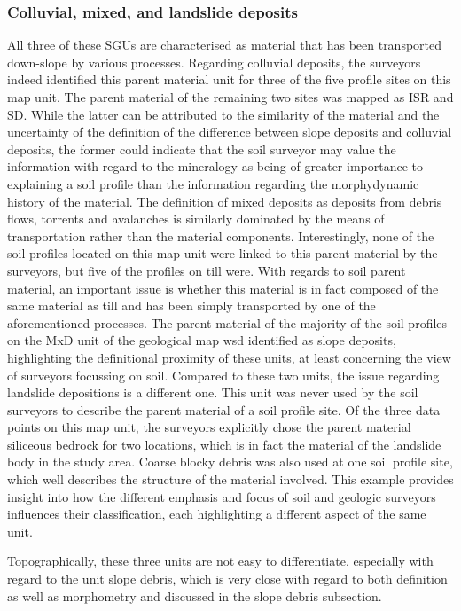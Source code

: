 \documentclass[preprint,12pt,authoryear]{elsarticle}
\begin{document}
\subsubsection{Colluvial, mixed, and landslide deposits}
All three of these SGUs are characterised as material that has been transported down-slope by various processes. Regarding colluvial deposits, the surveyors indeed identified this parent material unit for three of the five profile sites on this map unit. The parent material of the remaining two sites was mapped as ISR and SD. While the latter can be attributed to the similarity of the material and the uncertainty of the definition of the difference between slope deposits and colluvial deposits, the former could indicate that the soil surveyor may value the information with regard to the mineralogy as being of greater importance to explaining a soil profile  than the information regarding the morphydynamic history of the material. The definition of mixed deposits as deposits from debris flows, torrents and avalanches is similarly dominated by the means of transportation rather than the material components. Interestingly, none of the soil profiles located on this map unit were linked to this parent material by the surveyors, but five of the profiles on till were. With regards to soil parent material, an important issue is whether this material is in fact composed of the same material as till and has been simply transported by one of the aforementioned processes. The parent material of the majority of the soil profiles on the  MxD unit of the geological map wsd identified as slope deposits, highlighting the definitional proximity of these units, at least concerning the view of surveyors focussing on soil. Compared to these two units, the issue regarding landslide depositions is a different one. This unit was never used by the soil surveyors to describe the parent material of a soil profile site. Of the three data points on this map unit, the surveyors explicitly chose the parent material siliceous bedrock for two locations, which is in fact the material of the landslide body in the study area. Coarse blocky debris was also used at one soil profile site, which well describes the  structure of the material involved. This example provides insight into how the different emphasis and focus of soil and geologic surveyors influences their classification, each highlighting a different aspect of the same unit.

Topographically, these three units are not easy to differentiate, especially with regard to the unit slope debris, which is very close with regard to both definition as well as morphometry and discussed in the slope debris subsection.
\end{document}
